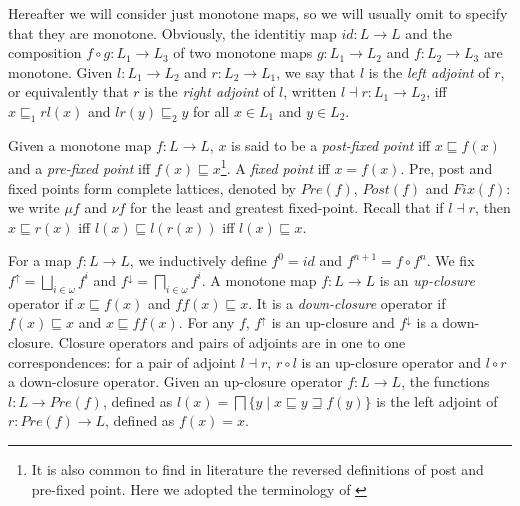 \documentclass{llncs}
\begin{document}
Hereafter we will consider just monotone maps, so we will usually omit to specify that they are monotone. Obviously, the identitiy map $id\colon L\to L$ and the composition $f\circ g \colon L_1\to L_3$ of two monotone maps $g\colon L_1\to L_2$ and  $f\colon L_2\to L_3$  are monotone. Given $l \colon L_1 \to L_2$ and $r\colon L_2\to L_1$, we say that $l$ is the \emph{left adjoint} of $r$, or equivalently that $r$ is the \emph{right adjoint} of $l$, written $l\dashv r \colon L_1\to L_2$, iff $x\sqsubseteq_1 rl(x)$ and $lr(y) \sqsubseteq_2 y$ for all $x\in L_1$ and $y\in L_2$. %

Given a monotone map $f\colon L\to L$, $x$ is said to be a \emph{post-fixed point} iff  $x\sqsubseteq f(x)$ and a \emph{pre-fixed point} iff $f(x)\sqsubseteq x$\footnote{It is also common to find in literature the reversed definitions of post and pre-fixed point. Here we adopted the terminology of \cite{davey_priestley_2002}}. A \emph{fixed point} iff $x=f(x)$. Pre, post and fixed points form complete lattices, denoted by $Pre(f)$, $Post(f)$ and $Fix(f)$: we write $\mu f$ and $\nu f$ for the least and greatest fixed-point. Recall that if $l\dashv r$, then $x\sqsubseteq r(x)$ iff $l(x)\sqsubseteq l(r(x))$ iff $l(x)\sqsubseteq x$. %


For a map $f\colon L \to L$, we inductively define $f^0=id$ and $f^{n+1}=f\circ f^n$. We fix $f^\uparrow = \bigsqcup_{i\in \omega} f^i$ and $f^\downarrow = \bigsqcap_{i\in \omega} f^i$. A monotone map $f\colon L \to L$ is an \emph{up-closure} operator if $x\sqsubseteq f(x)$ and $ff(x) \sqsubseteq x$. It is a \emph{down-closure} operator if $f(x)\sqsubseteq x$ and $x \sqsubseteq ff(x)$. For any $f$, $f^\uparrow$ is an up-closure and $f^\downarrow$ is a down-closure. Closure operators and pairs of adjoints are in one to one correspondences: for a pair of adjoint $l\dashv r$, $r\circ l$ is an up-closure operator and $l\circ r$ a down-closure operator. Given an up-closure operator $f\colon L\to L$, the functions $l\colon L \to Pre(f)$, defined as $l(x) = \bigsqcap \{y \mid x\sqsubseteq y \sqsupseteq f(y) \}$ is the left adjoint of $r\colon Pre(f) \to L$, defined as $f(x)=x$.
\end{document}
